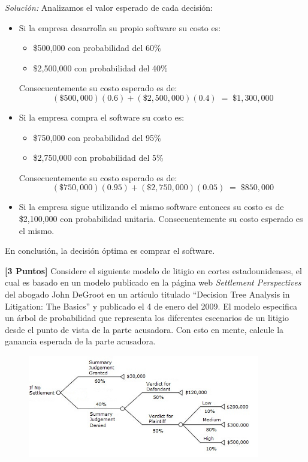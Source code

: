 \documentclass[ a4paper, twoside, 11pt]{article}
\begin{document}
\begin{problem}
\emph{Soluci\'on:} Analizamos el valor esperado de cada decisi\'on:
\begin{itemize}
\item Si la empresa desarrolla su propio software su costo es:
\begin{itemize}
\item \$500,000 con probabilidad del 60\%
\item \$2,500,000 con probabilidad del 40\%
\end{itemize}
Consecuentemente su costo esperado es de:
\[
(\$500,000)(0.6) + (\$2,500,000)(0.4) \; = \; \$1,300,000
\]
\item Si la empresa compra el software su costo es:
\begin{itemize}
\item \$750,000 con probabilidad del 95\%
\item \$2,750,000 con probabilidad del 5\%
\end{itemize}
Consecuentemente su costo esperado es de:
\[
(\$750,000)(0.95) + (\$2,750,000)(0.05) \; = \; \$850,000
\]
\item Si la empresa sigue utilizando el mismo software entonces su costo es de \$2,100,000 con probabilidad unitaria. Consecuentemente su costo esperado es el mismo.
\end{itemize}
En conclusi\'on, la decisi\'on \'optima es comprar el software.

\end{problem}
\vspace{\baselineskip}

\begin{problem}
\textbf{[3 Puntos]} Considere el siguiente modelo de litigio en cortes estadounidenses, el cual es basado en un modelo publicado en la p\'agina web \emph{Settlement Perspectives} del abogado John DeGroot en un art\'iculo titulado ``Decision Tree Analysis in Litigation: The Basics'' y publicado el 4 de enero del 2009. El modelo especifica un \'arbol de probabilidad que representa los diferentes escenarios de un litigio desde el punto de vista de la parte acusadora. Con esto en mente, calcule la ganancia esperada de la parte acusadora. 

\begin{figure}[H]
\centering
\includegraphics[width=0.9\textwidth]{problema_arbol-recompensas.jpg}
\end{figure}

\end{problem}
\vspace{\baselineskip}
\end{document}
